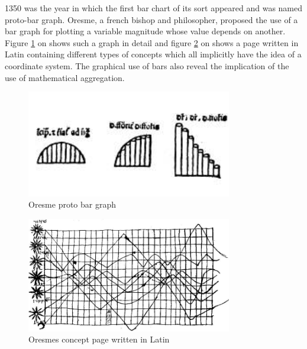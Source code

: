 1350 was the year in which the first bar chart of its sort appeared and was named proto-bar graph. Oresme, a french bishop and philosopher, proposed the use of a bar graph for plotting a variable magnitude whose value depends on another. Figure \ref{fig:oresme-proto} on \pageref{fig:oresme-proto} shows such a graph in detail and figure \ref{fig:oresme-page} on \pageref{fig:oresme-page} shows a page written in Latin containing different types of concepts which all implicitly have the idea of a coordinate system. The graphical use of bars also reveal the implication of the use of mathematical aggregation.

\begin{figure}[h]
\centering
\includegraphics[width=0.8\textwidth,keepaspectratio]{images/history/oresme-proto.jpg}
\caption[
    Oresme proto bar graph, Urldate: 07.2016 \newline
\small\texttt{\url{http://datavis.ca/milestones//admin/uploads/images/icons/oresmekl.gif}}
]{Oresme proto bar graph}
\label{fig:oresme-proto}
\end{figure}

\begin{figure}[h]
\centering
\includegraphics[width=0.8\textwidth,keepaspectratio]{images/history/planetary-movement.jpg}
\caption[
    Oresmes concept page written in Latin, Urldate: 07.2016 \newline
\small\texttt{\url{http://datavis.ca/milestones//admin/uploads/images/oresme6.gif}}
]{Oresmes concept page written in Latin}
\label{fig:oresme-page}
\end{figure}


